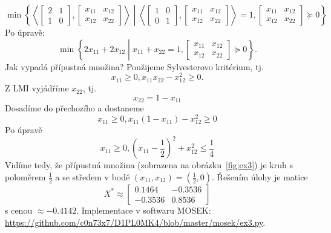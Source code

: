 \begin{pr}
    \begin{equation}\tag{P3}
        \min \left\{
            \left\langle
            \begin{bmatrix}
                2 & 1 \\
                1 & 0
            \end{bmatrix},
            \begin{bmatrix}
                x_{11} & x_{12} \\
                x_{12} & x_{22}
            \end{bmatrix}
            \right\rangle \middle|
            \left\langle
            \begin{bmatrix}
                1 & 0 \\
                0 & 1
            \end{bmatrix},
            \begin{bmatrix}
                x_{11} & x_{12} \\
                x_{12} & x_{22}
            \end{bmatrix}
            \right\rangle = 1,
            \begin{bmatrix}
                x_{11} & x_{12} \\
                x_{12} & x_{22}
            \end{bmatrix} \succeq 0
        \right\}
        \label{eq:P3}
    \end{equation}
    Po úpravě:
    $$
        \min \left\{
            2 x_{11} + 2 x_{12} \middle| x_{11} + x_{22} = 1, 
            \begin{bmatrix}
                x_{11} & x_{12} \\
                x_{12} & x_{22}
            \end{bmatrix} \succeq 0
        \right\}.
    $$
    Jak vypadá přípustná množina? Použijeme Sylvesterovo kritérium, tj.
    $$
        x_{11} \geq 0, x_{11} x_{22} - x_{12}^2 \geq 0.
    $$
    Z LMI vyjádříme $x_{22}$, tj.
    $$
        x_{22} = 1 - x_{11}
    $$
    Dosadíme do přechozího a dostaneme
    $$
        x_{11} \geq 0, x_{11} \left(1 - x_{11}\right) - x_{12}^2 \geq 0
    $$
    Po úpravě
    $$
        x_{11} \geq 0, \left(x_{11} - \frac{1}{2}\right)^2 + x_{12}^2 \leq \frac{1}{4}
    $$
    Vidíme tedy, že přípustná množina (zobrazena na obrázku~\ref{fig:ex3}) je kruh s poloměrem $\frac{1}{2}$ a se středem v bodě $(x_{11}, x_{12}) = (\frac{1}{2}, 0)$. Řešením úlohy je matice
    $$
        X^* \approx
        \begin{bmatrix}
            0.1464  & -0.3536 \\
            -0.3536 &  0.8536
        \end{bmatrix}
    $$
    s cenou $\approx -0.4142$. Implementace v softwaru MOSEK: \url{https://github.com/c0n73x7/D1PL0MK4/blob/master/mosek/ex3.py}.
\end{pr}

